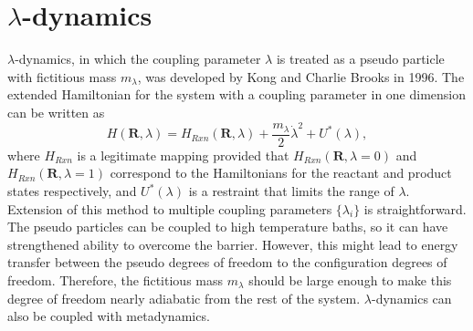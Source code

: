 \section{\texorpdfstring{$\lambda$-dynamics}{λ-dynamics}\label{Sec:ES:lambdadynamics}}
$\lambda$-dynamics, in which the coupling parameter $\lambda$ is treated as a pseudo particle with fictitious mass $m_\lambda$, was developed by Kong and Charlie Brooks in 1996.\cite{KongJCP1996}
The extended Hamiltonian for the system with a coupling parameter in one dimension can be written as
\begin{equation}
	H(\mathbf{R},\lambda)=H_{Rxn}(\mathbf{R},\lambda) + \frac{m_\lambda}{2}{\dot{\lambda}}^2+U^{*}(\lambda),
\end{equation}
where $H_{Rxn}$ is a legitimate mapping provided that $H_{Rxn}(\mathbf{R},\lambda=0)$ and $H_{Rxn}(\mathbf{R},\lambda=1)$ correspond to the Hamiltonians for the reactant and product states respectively, and $U^{*}(\lambda)$ is a restraint that limits the range of $\lambda$. Extension of this method to multiple coupling parameters $\{\lambda_i\}$ is straightforward. The pseudo particles can be coupled to high temperature baths, so it can have strengthened ability to overcome the barrier. However, this might lead to energy transfer between the pseudo degrees of freedom to the configuration degrees of freedom. Therefore, the fictitious mass $m_\lambda$ should be large enough to make this degree of freedom nearly adiabatic from the rest of the system.\cite{AbramsJCP2006} $\lambda$-dynamics can also be coupled with metadynamics.\cite{WuJPCL2011}